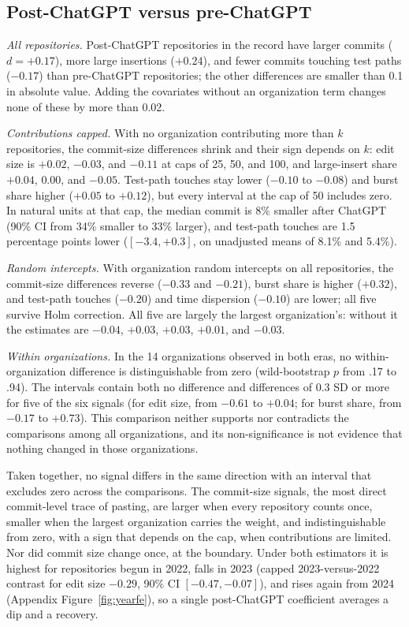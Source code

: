 \documentclass[acmsmall,screen,review,anonymous]{acmart}
\begin{document}
\subsection{Post-ChatGPT versus pre-ChatGPT}
\label{sec:results-era}

\textit{All repositories.} Post-ChatGPT repositories in the record have larger commits ($d = +0.17$), more large insertions ($+0.24$), and fewer commits touching test paths ($-0.17$) than pre-ChatGPT repositories; the other differences are smaller than 0.1 in absolute value. Adding the covariates without an organization term changes none of these by more than 0.02.

\textit{Contributions capped.} With no organization contributing more than $k$ repositories, the commit-size differences shrink and their sign depends on $k$: edit size is $+0.02$, $-0.03$, and $-0.11$ at caps of 25, 50, and 100, and large-insert share $+0.04$, $0.00$, and $-0.05$. Test-path touches stay lower ($-0.10$ to $-0.08$) and burst share higher ($+0.05$ to $+0.12$), but every interval at the cap of 50 includes zero. In natural units at that cap, the median commit is 8\% smaller after ChatGPT (90\% CI from 34\% smaller to 33\% larger), and test-path touches are 1.5 percentage points lower ($[-3.4, +0.3]$, on unadjusted means of 8.1\% and 5.4\%).

\textit{Random intercepts.} With organization random intercepts on all repositories, the commit-size differences reverse ($-0.33$ and $-0.21$), burst share is higher ($+0.32$), and test-path touches ($-0.20$) and time dispersion ($-0.10$) are lower; all five survive Holm correction. All five are largely the largest organization's: without it the estimates are $-0.04$, $+0.03$, $+0.03$, $+0.01$, and $-0.03$.

\textit{Within organizations.} In the 14 organizations observed in both eras, no within-organization difference is distinguishable from zero (wild-bootstrap $p$ from .17 to .94). The intervals contain both no difference and differences of 0.3 SD or more for five of the six signals (for edit size, from $-0.61$ to $+0.04$; for burst share, from $-0.17$ to $+0.73$). This comparison neither supports nor contradicts the comparisons among all organizations, and its non-significance is not evidence that nothing changed in those organizations.

Taken together, no signal differs in the same direction with an interval that excludes zero across the comparisons. The commit-size signals, the most direct commit-level trace of pasting, are larger when every repository counts once, smaller when the largest organization carries the weight, and indistinguishable from zero, with a sign that depends on the cap, when contributions are limited. Nor did commit size change once, at the boundary. Under both estimators it is highest for repositories begun in 2022, falls in 2023 (capped 2023-versus-2022 contrast for edit size $-0.29$, 90\% CI $[-0.47, -0.07]$), and rises again from 2024 (Appendix Figure~\ref{fig:yearfe}), so a single post-ChatGPT coefficient averages a dip and a recovery.
\end{document}
